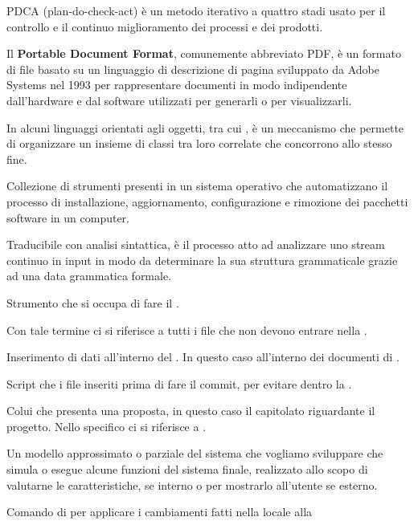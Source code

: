 PDCA (plan-do-check-act) è un metodo iterativo a quattro stadi usato per il controllo e il continuo miglioramento dei processi e dei prodotti.

Il \textbf{Portable Document Format}, comunemente abbreviato PDF, è un formato di file basato su un linguaggio di descrizione di pagina sviluppato da Adobe Systems nel 1993 per rappresentare documenti in modo indipendente dall'hardware e dal software utilizzati per generarli o per visualizzarli. 

In alcuni linguaggi orientati agli oggetti, tra cui , è un meccanismo che permette di organizzare un insieme di classi tra loro correlate che concorrono allo stesso fine.

Collezione di strumenti presenti in un sistema operativo che automatizzano il processo di installazione, aggiornamento, configurazione e rimozione dei pacchetti software in un computer.

Traducibile con analisi sintattica, è il processo atto ad analizzare uno stream continuo in input in modo da determinare la sua struttura grammaticale grazie ad una data grammatica formale.

Strumento che si occupa di fare il .

Con tale termine ci si riferisce a tutti i file che non devono entrare nella .

Inserimento di dati all'interno del . In questo caso all'interno dei documenti di .

Script che  i file inseriti prima di fare il commit, per evitare  dentro la .

Colui che presenta una proposta, in questo caso il capitolato riguardante il progetto.
Nello specifico ci si riferisce a \Proponente{}.

Un modello approssimato o parziale del sistema che vogliamo sviluppare che simula o esegue alcune funzioni del sistema finale, realizzato allo scopo di valutarne le caratteristiche, se interno o per mostrarlo all'utente se esterno.

Comando di  per applicare i cambiamenti fatti nella  locale alla 

